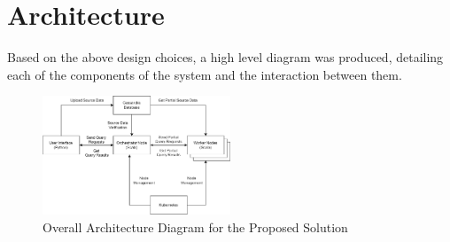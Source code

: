 \section{Architecture}

Based on the above design choices, a high level diagram was produced, detailing each of the components of the system and the interaction between them. 

\begin{figure}[h]
	\centering
	\includegraphics[width=0.5\textwidth]{chapters/diagrams/design/architecture-overall}
	\caption{Overall Architecture Diagram for the Proposed Solution}
\end{figure}

